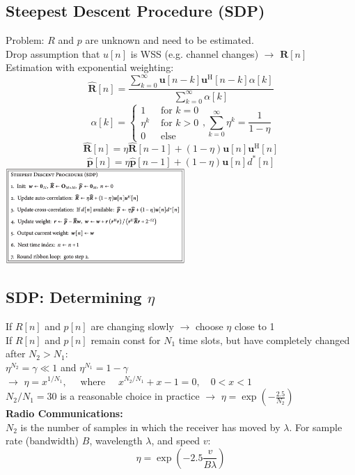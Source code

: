 \documentclass[english]{latex4ei/latex4ei_sheet}
\begin{document}
\begin{sectionbox}
  \subsection{Steepest Descent Procedure (SDP)}
  Problem: $R$ and $p$ are  unknown and need to be estimated.\\
  Drop assumption that $u[n]$ is WSS (e.g. channel changes) $\rightarrow$ $\boldsymbol{R}[n]$\\
  Estimation with exponential weighting:\\
  $$\widehat{\boldsymbol{R}}[n]=\frac{\sum_{k=0}^{\infty} \boldsymbol{u}[n-k] \boldsymbol{u}^{\mathrm{H}}[n-k] \alpha[k]}{\sum_{k=0}^{\infty} \alpha[k]}$$
  $$\alpha[k]= \begin{cases}1 & \text { for } k=0 \\ \eta^{k} & \text { for } k>0 \\ 0 & \text { else }\end{cases}, \sum_{k=0}^{\infty} \eta^{k}=\frac{1}{1-\eta}$$
  $$\widehat{\boldsymbol{R}}[n]=\eta \widehat{\boldsymbol{R}}[n-1]+(1-\eta) \boldsymbol{u}[n] \boldsymbol{u}^{\mathrm{H}}[n]$$
  $$\widehat{\boldsymbol{p}}[n]=\eta \widehat{\boldsymbol{p}}[n-1]+(1-\eta) \boldsymbol{u}[n] d^{*}[n]$$
  \includegraphics[width = 6.8cm]{img/sdp.png}
\end{sectionbox}

\begin{sectionbox}
  \subsection{SDP: Determining $\eta$}
  If $R[n]$ and $p[n]$ are changing slowly $\rightarrow$ choose $\eta$ close to 1\\
  If $R[n]$ and $p[n]$ remain const for $N_1$ time slots, but have completely changed after $N_2 > N_1$:\\
  $\eta^{N_{2}}=\gamma \ll 1$ and $\eta^{N_{1}}=1-\gamma$\\
  $\rightarrow$ $\eta=x^{1 / N_{1}}, \quad \text { where } \quad x^{N_{2} / N_{1}}+x-1=0, \quad 0<x<1$\\
  $N_{2} / N_{1}=30$ is a reasonable choice in practice $\rightarrow$ $\eta=\exp \left(-\frac{2.5}{N_{2}}\right)$\\

  \textbf{Radio Communications:}\\
  $N_2$ is the number of samples in which the receiver has moved by $\lambda$.
  For sample rate (bandwidth) $B$, wavelength $\lambda$, and speed $v$: $$\eta=\exp \left(-2.5 \frac{v}{B \lambda}\right)$$
\end{sectionbox}
\end{document}
